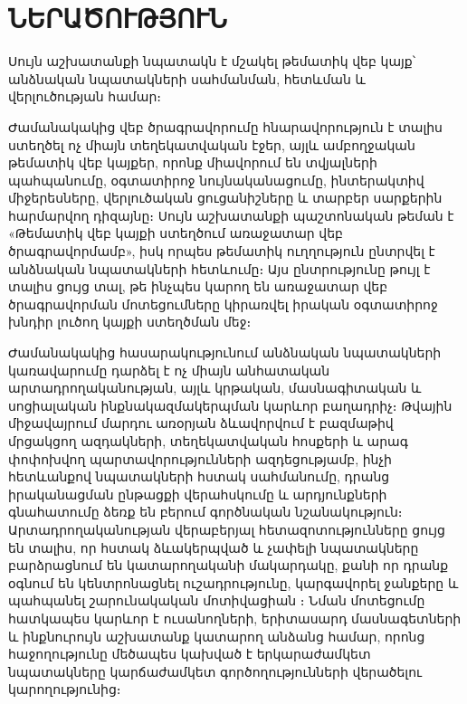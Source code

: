 \chapter{ՆԵՐԱԾՈՒԹՅՈՒՆ}
\sloppy

\hspace*{\parindent}Սույն աշխատանքի նպատակն է մշակել թեմատիկ վեբ կայք՝ անձնական նպատակների սահմանման, հետևման և վերլուծության համար։

Ժամանակակից վեբ ծրագրավորումը հնարավորություն է տալիս ստեղծել ոչ միայն տեղեկատվական էջեր, այլև ամբողջական թեմատիկ վեբ կայքեր, որոնք միավորում են տվյալների պահպանումը, օգտատիրոջ նույնականացումը, ինտերակտիվ միջերեսները, վերլուծական ցուցանիշները և տարբեր սարքերին հարմարվող դիզայնը։ Սույն աշխատանքի պաշտոնական թեման է «Թեմատիկ վեբ կայքի ստեղծում առաջատար վեբ ծրագրավորմամբ», իսկ որպես թեմատիկ ուղղություն ընտրվել է անձնական նպատակների հետևումը։ Այս ընտրությունը թույլ է տալիս ցույց տալ, թե ինչպես կարող են առաջատար վեբ ծրագրավորման մոտեցումները կիրառվել իրական օգտատիրոջ խնդիր լուծող կայքի ստեղծման մեջ։

Ժամանակակից հասարակությունում անձնական նպատակների կառավարումը դարձել է ոչ միայն անհատական արտադրողականության, այլև կրթական, մասնագիտական և սոցիալական ինքնակազմակերպման կարևոր բաղադրիչ։ Թվային միջավայրում մարդու առօրյան ձևավորվում է բազմաթիվ մրցակցող ազդակների, տեղեկատվական հոսքերի և արագ փոփոխվող պարտավորությունների ազդեցությամբ, ինչի հետևանքով նպատակների հստակ սահմանումը, դրանց իրականացման ընթացքի վերահսկումը և արդյունքների գնահատումը ձեռք են բերում գործնական նշանակություն։ Արտադրողականության վերաբերյալ հետազոտությունները ցույց են տալիս, որ հստակ ձևակերպված և չափելի նպատակները բարձրացնում են կատարողականի մակարդակը, քանի որ դրանք օգնում են կենտրոնացնել ուշադրությունը, կարգավորել ջանքերը և պահպանել շարունակական մոտիվացիան \autocite{locke2002building}։ Նման մոտեցումը հատկապես կարևոր է ուսանողների, երիտասարդ մասնագետների և ինքնուրույն աշխատանք կատարող անձանց համար, որոնց հաջողությունը մեծապես կախված է երկարաժամկետ նպատակները կարճաժամկետ գործողությունների վերածելու կարողությունից։

